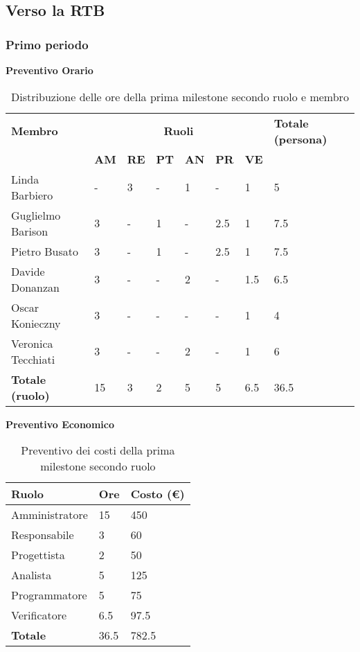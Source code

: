 \subsection{Verso la RTB}
\subsubsection{Primo periodo}
\textbf{Preventivo Orario}
\begin{table}[ht!]
	\centering
	\begin{tabular}{p{4cm} p{1cm} p{1cm} p{1cm} p{1cm} p{1cm} p{1cm} p{3cm}}
		\toprule
        \textbf{Membro} & \multicolumn{6}{c}{\textbf{Ruoli}} & \textbf{Totale (persona)}\\
		& \textbf{AM} & \textbf{RE} & \textbf{PT} & \textbf{AN} & \textbf{PR} & \textbf{VE}\\
		\midrule
        Linda Barbiero & - & 3 & - & 1 & - & 1 & 5 \\
        Guglielmo Barison & 3 & - & 1 & - & 2.5 & 1 & 7.5\\
        Pietro Busato & 3 & - & 1 & - & 2.5 & 1 & 7.5 \\
        Davide Donanzan & 3 & - & - & 2 & - & 1.5 & 6.5 \\
        Oscar Konieczny & 3 & - & - & - & - & 1 & 4 \\
        Veronica Tecchiati & 3 & - & - & 2 & - & 1 & 6 \\
        \bottomrule
        \textbf{Totale (ruolo)} & 15 & 3 & 2 & 5 & 5 & 6.5 & 36.5 \\
	\end{tabular}
	\caption{Distribuzione delle ore della prima milestone secondo ruolo e membro}
	\label{table:Distribuzione delle ore della prima milestone secondo ruolo e membro}
\end{table}
\newpage
\textbf{Preventivo Economico}
\begin{table}[ht!]
	\centering
	\begin{tabular}{p{4cm} p{1cm} p{2cm}}
        \toprule
        \textbf{Ruolo} & \textbf{Ore} & \textbf{Costo (€)} \\
        \midrule
        Amministratore & 15 & 450 \\
        Responsabile & 3 & 60 \\
        Progettista & 2 & 50 \\
        Analista & 5 & 125 \\
        Programmatore & 5 & 75 \\
        Verificatore & 6.5 & 97.5 \\
        \bottomrule
        \textbf{Totale} & 36.5 & 782.5
    \end{tabular}
    \caption{Preventivo dei costi della prima milestone secondo ruolo}
	\label{table:Preventivo dei costi della prima milestone secondo ruolo}
\end{table}


